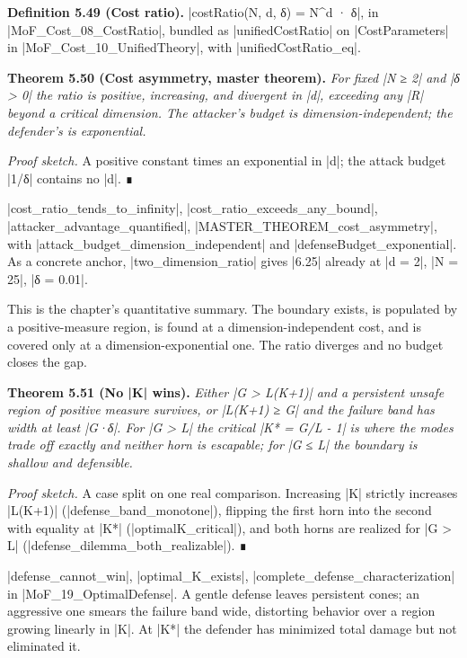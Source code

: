 \documentclass{memoir}
\begin{document}
\textbf{Definition 5.49 (Cost ratio).} \LeanVerb|costRatio(N, d, δ) = N^d · δ|, in \LeanVerb|MoF_Cost_08_CostRatio|,
bundled as \LeanVerb|unifiedCostRatio| on \LeanVerb|CostParameters| in
\LeanVerb|MoF_Cost_10_UnifiedTheory|, with \LeanVerb|unifiedCostRatio_eq|.

\textbf{Theorem 5.50 (Cost asymmetry, master theorem).} \emph{For fixed \LeanVerb|N ≥ 2| and \LeanVerb|δ > 0| the ratio
is positive, increasing, and divergent in \LeanVerb|d|, exceeding any \LeanVerb|R| beyond a
critical dimension. The attacker's budget is dimension-independent; the
defender's is exponential.}

\emph{Proof sketch.} A positive constant times an exponential in \LeanVerb|d|; the attack budget \LeanVerb|1/δ|
contains no \LeanVerb|d|. ∎

\LeanVerb|cost_ratio_tends_to_infinity|, \LeanVerb|cost_ratio_exceeds_any_bound|,
\LeanVerb|attacker_advantage_quantified|, \LeanVerb|MASTER_THEOREM_cost_asymmetry|, with
\LeanVerb|attack_budget_dimension_independent| and \LeanVerb|defenseBudget_exponential|. As a
concrete anchor, \LeanVerb|two_dimension_ratio| gives \LeanVerb|6.25| already at \LeanVerb|d = 2|, \LeanVerb|N = 25|,
\LeanVerb|δ = 0.01|.

This is the chapter's quantitative summary. The boundary exists, is populated by
a positive-measure region, is found at a dimension-independent cost, and is
covered only at a dimension-exponential one. The ratio diverges and no budget
closes the gap.

\textbf{Theorem 5.51 (No \LeanVerb|K| wins).} \emph{Either \LeanVerb|G > L(K+1)| and a persistent unsafe region of
positive measure survives, or \LeanVerb|L(K+1) ≥ G| and the failure band has width at
least \LeanVerb|G·δ|. For \LeanVerb|G > L| the critical \LeanVerb|K* = G/L - 1| is where the modes trade
off exactly and neither horn is escapable; for \LeanVerb|G ≤ L| the boundary is shallow
and defensible.}

\emph{Proof sketch.} A case split on one real comparison. Increasing \LeanVerb|K| strictly increases
\LeanVerb|L(K+1)| (\LeanVerb|defense_band_monotone|), flipping the first horn into the second with
equality at \LeanVerb|K*| (\LeanVerb|optimalK_critical|), and both horns are realized for \LeanVerb|G > L|
(\LeanVerb|defense_dilemma_both_realizable|). ∎

\LeanVerb|defense_cannot_win|, \LeanVerb|optimal_K_exists|, \LeanVerb|complete_defense_characterization| in
\LeanVerb|MoF_19_OptimalDefense|. A gentle defense leaves persistent cones; an aggressive
one smears the failure band wide, distorting behavior over a region growing
linearly in \LeanVerb|K|. At \LeanVerb|K*| the defender has minimized total damage but not
eliminated it.
\end{document}
